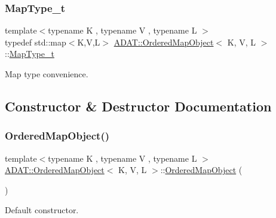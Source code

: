 \subsubsection{\texorpdfstring{MapType\_t}{MapType\_t}}
{\footnotesize\ttfamily template$<$typename K , typename V , typename L $>$ \\
typedef std\+::map$<$K,V,L$>$ \mbox{\hyperlink{classADAT_1_1OrderedMapObject}{A\+D\+A\+T\+::\+Ordered\+Map\+Object}}$<$ K, V, L $>$\+::\mbox{\hyperlink{classADAT_1_1OrderedMapObject_a4341262d590e4628319a61210534ab88}{Map\+Type\+\_\+t}}}



Map type convenience. 



\subsection{Constructor \& Destructor Documentation}
\mbox{\label{classADAT_1_1OrderedMapObject_ac9ea7852b3e405d4e0c6744626cb6f24}} 
\subsubsection{\texorpdfstring{OrderedMapObject()}{OrderedMapObject()}}
{\footnotesize\ttfamily template$<$typename K , typename V , typename L $>$ \\
\mbox{\hyperlink{classADAT_1_1OrderedMapObject}{A\+D\+A\+T\+::\+Ordered\+Map\+Object}}$<$ K, V, L $>$\+::\mbox{\hyperlink{classADAT_1_1OrderedMapObject}{Ordered\+Map\+Object}} (\begin{DoxyParamCaption}{ }\end{DoxyParamCaption})\hspace{0.3cm}{\ttfamily [inline]}}



Default constructor. 

\mbox{\label{classADAT_1_1OrderedMapObject_a255777a3e2ecc4482ad8d2adf630a8d2}} 
